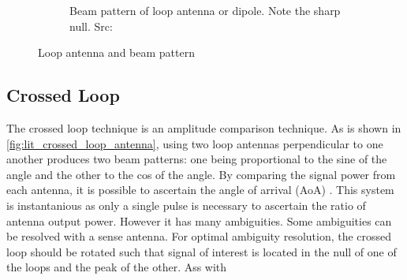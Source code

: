 \begin{figure}
\begin{subfigure}[b]{0.4\textwidth}
   \caption{Beam pattern of loop antenna or dipole. Note the sharp null. Src: \cite{jenkins1991smallaperture}}
  \end{subfigure}
  \caption{Loop antenna and beam pattern}
  \label{fig:lit_loop_antenna}
\end{figure}

\subsection{Crossed Loop}
The crossed loop technique is an amplitude comparison technique. As is shown in \autoref{fig:lit_crossed_loop_antenna}, using two loop antennas perpendicular to one another produces two beam patterns: one being proportional to the sine of the angle and the other to the cos of the angle. By comparing the signal power from each antenna, it is possible to ascertain the angle of arrival (AoA) . This system is instantanious as only a single pulse is necessary to ascertain the ratio of antenna output power. However it has many ambiguities. Some ambiguities can be resolved with a sense antenna. For optimal ambiguity resolution, the crossed loop should be rotated such that signal of interest is located in the null of one of the loops and the peak of the other. Ass with
